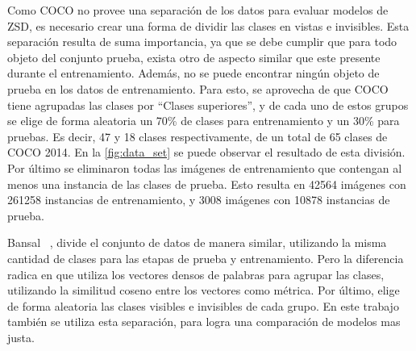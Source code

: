 Como COCO no provee una separación de los datos para evaluar modelos de ZSD, es necesario crear una forma de dividir las clases en vistas e invisibles. Esta separación resulta de suma importancia, ya que se debe cumplir que para todo objeto del conjunto prueba, exista otro de aspecto similar que este presente durante el entrenamiento. Además, no se puede encontrar ningún objeto de prueba en los datos de entrenamiento. Para esto, se aprovecha de que COCO tiene agrupadas las clases por ``Clases superiores'', y de cada uno de estos grupos se elige de forma aleatoria un 70\% de clases para entrenamiento y un 30\% para pruebas. Es decir, 47 y 18 clases respectivamente, de un total de 65 clases de COCO 2014. En la \autoref{fig:data_set} se puede observar el resultado de esta división. Por último se eliminaron todas las imágenes de entrenamiento que contengan al menos una instancia de las clases de prueba. Esto resulta en 42564 imágenes con 261258 instancias de entrenamiento, y 3008 imágenes con 10878 instancias de prueba. 

Bansal \etal~\cite{bansal2018zero}, divide el conjunto de datos de manera similar, utilizando la misma cantidad de clases para las etapas de prueba y entrenamiento. Pero la diferencia radica en que utiliza los vectores densos de palabras para agrupar las clases, utilizando la  similitud coseno entre los vectores como métrica. Por último, elige de forma aleatoria las clases visibles e invisibles de cada grupo. En este trabajo también se utiliza esta separación, para logra una comparación de modelos mas justa.


